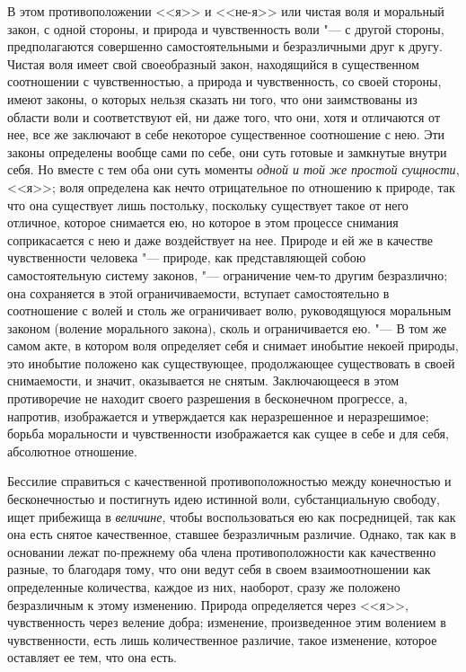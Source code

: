 В этом противоположении <<я>> и <<не-я>> или чистая воля и моральный закон, с
одной стороны, и природа и чувственность воли "--- с другой стороны,
предполагаются совершенно самостоятельными и безразличными друг к другу.
Чистая воля имеет свой своеобразный закон, находящийся в существенном
соотношении с чувственностью, а природа и чувственность, со своей стороны,
имеют законы, о которых нельзя сказать ни того, что они заимствованы из
области воли и соответствуют ей, ни даже того, что они, хотя и отличаются
от нее, все же заключают в себе некоторое существенное соотношение с нею.
Эти законы определены вообще сами по себе, они суть готовые и замкнутые
внутри себя. Но вместе с тем оба они суть моменты
{\em одной и той же простой сущности}, <<я>>; воля
определена как нечто отрицательное по отношению к природе, так что она
существует лишь постольку, поскольку существует такое от него отличное,
которое снимается ею, но которое в этом процессе снимания соприкасается с
нею и даже воздействует на нее. Природе и ей же в качестве чувственности
человека "--- природе, как представляющей собою самостоятельную систему
законов, "--- ограничение чем-то другим безразлично; она сохраняется в этой
ограничиваемости, вступает самостоятельно в соотношение с волей и столь же
ограничивает волю, руководящуюся моральным законом (воление морального
закона), сколь и ограничивается ею. "--- В том же самом акте, в котором воля
определяет себя и снимает инобытие некоей природы, это инобытие положено
как существующее, продолжающее существовать в своей снимаемости, и значит,
оказывается не снятым. Заключающееся в этом противоречие не находит своего
разрешения в бесконечном прогрессе, а, напротив, изображается и
утверждается как неразрешенное и неразрешимое; борьба моральности и
чувственности изображается как сущее в себе и для себя, абсолютное
отношение.

Бессилие справиться с качественной противоположностью между конечностью и
бесконечностью и постигнуть идею истинной воли, субстанциальную свободу,
ищет прибежища в {\em величине}, чтобы воспользоваться
ею как посредницей, так как она есть снятое качественное, ставшее
безразличным различие. Однако, так как в основании лежат по-прежнему оба
члена противоположности как качественно разные, то благодаря тому, что они
ведут себя в своем взаимоотношении как определенные количества, каждое из
них, наоборот, сразу же положено безразличным к этому изменению. Природа
определяется через <<я>>, чувственность через веление добра; изменение,
произведенное этим волением в чувственности, есть лишь количественное
различие, такое изменение, которое оставляет ее тем, что она есть.

